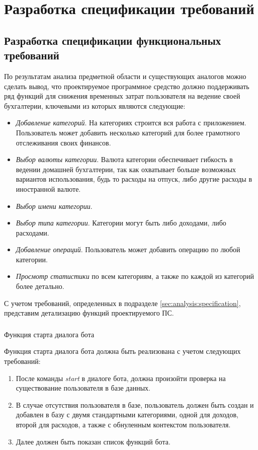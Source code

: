 \section{Разработка спецификации требований}
\label{sec:domain}

\subsection{Разработка спецификации функциональных требований}
\label{sec:domain:specification}

По результатам анализа предметной области и существующих аналогов можно сделать вывод, что проектируемое программное средство должно поддерживать ряд функций для снижения временных затрат пользователя на ведение своей бухгалтерии, ключевыми из которых являются следующие:

\begin{itemize}
	\item \emph{Добавление категорий}. На категориях строится вся работа с приложением. Пользователь может добавить несколько категорий для более грамотного отслеживания своих финансов.
	\item \emph{Выбор валюты категории}. Валюта категории обеспечивает гибкость в ведении домашней бухгалтерии, так как охватывает больше возможных вариантов использования, будь то расходы на отпуск, либо другие расходы в иностранной валюте.
	\item \emph{Выбор имени категории}.
	\item \emph{Выбор типа категории}. Категории могут быть либо доходами, либо расходами.
	\item \emph{Добавление операций}. Пользователь может добавить операцию по любой категории. 
	\item \emph{Просмотр статистики} по всем категориям, а также по каждой из категорий более детально.
\end{itemize}

С учетом требований, определенных в подразделе \ref{sec:analysis:specification}, представим детализацию функций проектируемого ПС.

\subsubsection{} Функция старта диалога бота
\label{sec:domain:specification:startdialog}

Функция старта диалога бота должна быть реализована с учетом следующих требований:

\begin{enumerate}
	\item После команды \emph{start} в диалоге бота, должна произойти проверка на существование пользователя в базе данных.
	\item В случае отсутствия пользователя в базе, пользователь должен быть создан и добавлен в базу с двумя стандартными категориями, одной для доходов, второй для расходов, а также с обнуленным контекстом пользователя.
	\item Далее должен быть показан список функций бота.
\end{enumerate}

